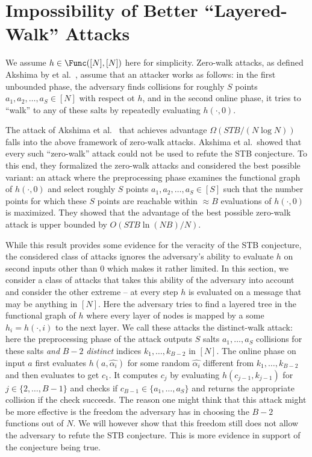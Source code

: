 \section{Impossibility of Better ``Layered-Walk'' Attacks}\label{app:mw}
We assume $h\in \Func([N],[N])$ here for simplicity. 
Zero-walk attacks, as defined Akshima by et al.~\cite{AkshimaCDW20}, assume that an attacker works as follows: in the first unbounded phase, the adversary finds collisions for roughly $S$ points $a_1,a_2,\ldots,a_S\in [N]$ with respect ot $h$, and in the second online phase, it tries to ``walk'' to any of these salts by repeatedly evaluating $h(\cdot,0)$. 

The attack of Akshima et al.~\cite{AkshimaCDW20} that achieves advantage $\Omega({STB}/{(N\log N)})$ falls into the above framework of zero-walk attacks. Akshima et al.\ showed that every such ``zero-walk'' attack could not be used to refute the STB conjecture. To this end, they formalized the zero-walk attacks and considered the best possible variant: an attack where the preprocessing phase examines the functional graph of $h(\cdot,0)$ and select roughly $S$ points $a_1,a_2,\ldots,a_S\in [S]$ such that the number points for which these $S$ points are reachable within $\approx B$ evaluations of $h(\cdot,0)$ is maximized. They showed that the advantage of the best possible zero-walk attack is upper bounded by $O({STB\ln(NB)/N})$.

While this result provides some evidence for the veracity of the STB conjecture, the considered class of attacks ignores the adversary's ability to evaluate $h$ on second inputs other than $0$ which makes it rather limited. In this section, we consider a class of attacks that takes this ability of the adversary into account and consider the other extreme -- at every step $h$ is evaluated on a message that may be anything in $[N]$. Here the adversary tries to find a layered tree in the functional graph of $h$ where every layer of nodes is mapped by a some $h_i=h(\cdot,i)$ to the next layer. 
We call these attacks the distinct-walk attack: here the preprocessing phase of the attack outputs $S$ salts $a_1,\ldots,a_S$ collisions for these salts \emph{and} $B-2$ \emph{distinct} indices $k_1,\ldots,k_{B-2}$ in $[N]$. The online phase on input $a$ first evaluates $h(a,\hat{\alpha_i})$ for some random $\hat{\alpha_i}$ different from $k_1,\ldots,k_{B-2}$ and then evaluates to get $c_1$. It computes $c_{j}$ by evaluating $h(c_{j-1},k_{j-1})$ for $j\in \{2,\ldots,B-1\}$ and checks if $c_{B-1}\in \{a_1,\ldots,a_S\}$ and returns the appropriate collision if the check succeeds. The reason one might think that this attack might be more effective is the freedom the adversary has in choosing the $B-2$ functions out of $N$. We will however show that this freedom still does not allow the adversary to refute the STB conjecture. This is more evidence in support of the conjecture being true.

